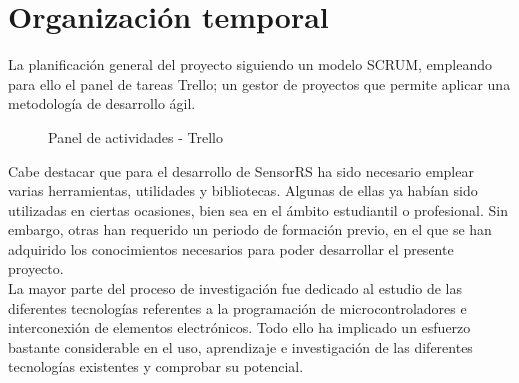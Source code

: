 

\newpage


\chapter{Organización temporal}
\label{chap:planificación}

La planificación general del proyecto siguiendo un modelo SCRUM, empleando para ello el panel de tareas Trello; un gestor de proyectos que permite aplicar una metodología de desarrollo ágil.\\

\begin{figure}[H]
\caption{Panel de actividades - Trello}
\end{figure}

Cabe destacar que para el desarrollo de SensorRS ha sido necesario emplear varias herramientas, utilidades y bibliotecas. Algunas de ellas ya habían sido utilizadas en ciertas
ocasiones, bien sea en el ámbito estudiantil o profesional. Sin embargo, otras han requerido un periodo de formación previo, en el que se han adquirido los conocimientos necesarios
para poder desarrollar el presente proyecto.\\

La mayor parte del proceso de investigación fue dedicado al estudio de las diferentes tecnologías referentes a la programación de microcontroladores e interconexión de elementos
electrónicos. Todo ello ha implicado un esfuerzo bastante considerable en el uso, aprendizaje e investigación de las diferentes tecnologías existentes y comprobar su potencial.\\

